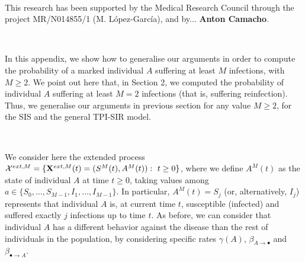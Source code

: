 \documentclass[preprint,12pt]{elsarticle}
\begin{document}

\vspace{1cm}

\par{}\\

\par\noindent This research has been supported by the Medical Research Council through the project MR/N014855/1 (M. L\'opez-Garc\'ia), and by... {\bf Anton Camacho}.\\

\vspace{1cm}

\par{}



\vspace{1cm}

\par{}\\

\par In this appendix, we show how to generalise our arguments in order to compute the probability of a marked individual $A$ suffering at least $M$
infections, with $M\geq2$. We point out here that, in Section 2, we computed the probability of individual $A$ suffering at least $M=2$ infections
(that is, suffering reinfection). Thus, we generalise our arguments in previous section for any value $M\geq2$, for the SIS and the general TPI-SIR model.\\

\vspace{0.5cm}

\par{}\\

\par We consider here the extended process ${\cal X}^{ext,M}=\{{\bf X}^{ext,M}(t)=(S^M(t),A^M(t)):\ t\geq0\}$, where we define $A^M(t)$ as the state of
individual $A$ at time $t\geq0$, taking values among $a\in\{S_0,\dots,S_{M-1},I_1,\dots,I_{M-1}\}$. In particular, $A^M(t)=S_j$ (or, alternatively,
$I_j$) represents that individual $A$ is, at current time $t$, susceptible (infected) and suffered exactly $j$ infections up to time $t$. As before, we
can consider that individual $A$ has a different behavior against the disease than the rest of individuals
in the population, by considering specific rates $\gamma(A)$, $\beta_{A\rightarrow\bullet}$ and $\beta_{\bullet\rightarrow A}$.
\end{document}
